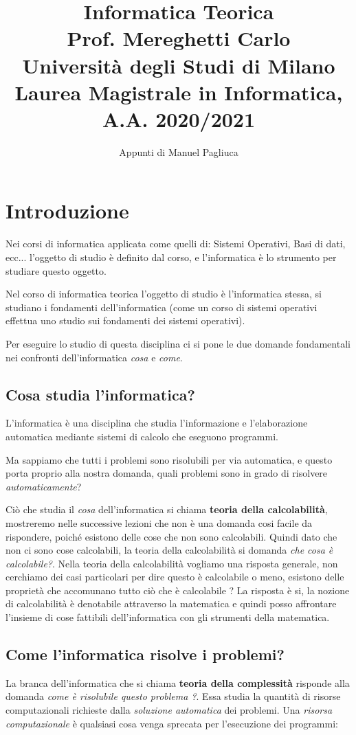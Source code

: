 \documentclass{article}
\title{%
  \textbf{Informatica Teorica}\\
  \large Prof. Mereghetti Carlo\\
    Università degli Studi di Milano\\
    Laurea Magistrale in Informatica, A.A. 2020/2021}
\author{Appunti di Manuel Pagliuca}
\begin{document}
\maketitle
\pagebreak
\tableofcontents
\pagebreak
\newpage
\section{Introduzione}
Nei corsi di informatica applicata come quelli di: Sistemi Operativi, Basi di dati, ecc... l'oggetto di studio è definito dal corso, e l'informatica è lo strumento per studiare questo oggetto.

Nel corso di informatica teorica l'oggetto di studio è l'informatica stessa, si studiano i fondamenti dell'informatica (come un corso di sistemi operativi effettua uno studio sui fondamenti dei sistemi operativi).

Per eseguire lo studio di questa disciplina ci si pone le due domande fondamentali nei confronti dell'informatica \textit{cosa} e \textit{come}.
\subsection{Cosa studia l'informatica?}
L'informatica è una disciplina che studia l'informazione e l'elaborazione automatica mediante sistemi di calcolo che eseguono programmi.

Ma sappiamo che tutti i problemi sono risolubili per via automatica, e questo porta proprio alla nostra domanda, quali problemi sono in grado di risolvere \textit{automaticamente}?

Ciò che studia il \textit{cosa} dell'informatica si chiama \textbf{teoria della calcolabilità}, mostreremo nelle successive lezioni che non è una domanda cosi facile da rispondere, poiché esistono delle cose che non sono calcolabili. Quindi dato che non ci sono cose calcolabili, la teoria della calcolabilità si domanda \textit{che cosa è calcolabile?}.
\newline
Nella teoria della calcolabilità vogliamo una risposta generale, non cerchiamo dei casi particolari per dire questo è calcolabile o meno, esistono delle proprietà che accomunano tutto ciò che è calcolabile ? La risposta è si, la nozione di calcolabilità è denotabile attraverso la matematica e quindi posso affrontare l'insieme di cose fattibili dell'informatica con gli strumenti della matematica.
\subsection{Come l'informatica risolve i problemi?}
La branca dell'informatica che si chiama \textbf{teoria della complessità} risponde alla domanda \textit{come è risolubile questo problema ?}. Essa studia la quantità di risorse computazionali richieste dalla \textit{soluzione automatica} dei problemi. Una \textit{risorsa computazionale} è qualsiasi cosa venga sprecata per l'esecuzione dei programmi:
\end{document}
